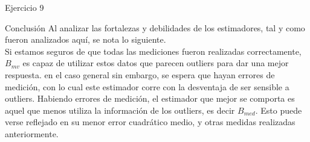 \begin{section}{Ejercicio 9}
\begin{subsection}{Conclusión}
Al analizar las fortalezas y debilidades de los estimadores, tal y como fueron analizados aquí, se nota lo siguiente. \\
Si estamos seguros de que todas las mediciones fueron realizadas correctamente, $B_{mv}$ es capaz de utilizar estos datos que parecen outliers para dar una mejor respuesta. en el caso general sin embargo, se espera que hayan errores de medición, con lo cual este estimador corre con la desventaja de ser sensible a outliers. Habiendo errores de medición, el estimador que mejor se comporta es aquel que menos utiliza la información de los outliers, es decir $B_{med}$. Esto puede verse reflejado en su menor error cuadrático medio, y otras medidas realizadas anteriormente.

\end{subsection}
\end{section}